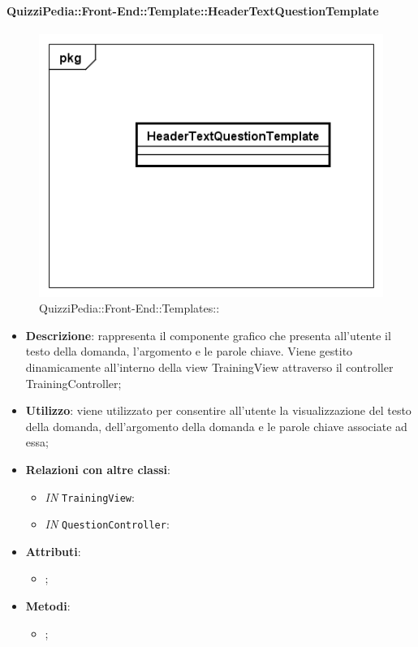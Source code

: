 		\paragraph{QuizziPedia::Front-End::Template::HeaderTextQuestionTemplate}
		
		\label{QuizziPedia::Front-End::Templates::HeaderTextQuestionTemplate}
		
		\begin{figure}[h]
			\centering
			\includegraphics[scale=0.5,keepaspectratio]{UML/Classi/Front-End/QuizziPedia_Front-end_Templates_HeaderTextQuestionTemplate.png}
			\caption{QuizziPedia::Front-End::Templates::}
		\end{figure}
		
		\begin{itemize}
			\item \textbf{Descrizione}: rappresenta il componente grafico che presenta all'utente il testo della domanda, l'argomento e le parole chiave. Viene gestito dinamicamente all'interno della view TrainingView attraverso il controller TrainingController;
			\item \textbf{Utilizzo}: viene utilizzato per consentire all'utente la visualizzazione del testo della domanda, dell'argomento della domanda e le parole chiave associate ad essa;
			\item \textbf{Relazioni con altre classi}: 
			\begin{itemize}
				\item \textit{IN} \texttt{TrainingView}: 
				\item \textit{IN} \texttt{QuestionController}:
			\end{itemize}
			\item \textbf{Attributi}: 
			\begin{itemize}
				\item ;
			\end{itemize}
			\item \textbf{Metodi}: 
			\begin{itemize}
				\item ;
			\end{itemize}
		\end{itemize}
		
